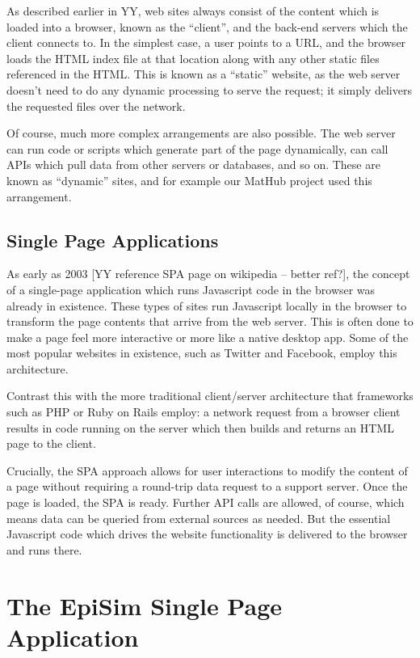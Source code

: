 As described earlier in YY, web sites always consist of the content which is loaded into a browser, known as the ``client'', and the back-end servers which the client connects to. In the simplest case, a user points to a URL, and the browser loads the HTML index file at that location along with any other static files referenced in the HTML. This is known as a ``static'' website, as the web server doesn't need to do any dynamic processing to serve the request; it simply delivers the requested files over the network.

Of course, much more complex arrangements are also possible. The web server can run code or scripts which generate part of the page dynamically, can call APIs which pull data from other servers or databases, and so on. These are known as ``dynamic'' sites, and for example our MatHub project used this arrangement.

\hypertarget{single-page-applications}{%
\subsection{Single Page Applications}\label{single-page-applications}}

As early as 2003 {[}YY reference SPA page on wikipedia -- better ref?{]}, the concept of a single-page application which runs Javascript code in the browser was already in existence. These types of sites run Javascript locally in the browser to transform the page contents that arrive from the web server. This is often done to make a page feel more interactive or more like a native desktop app. Some of the most popular websites in existence, such as Twitter and Facebook, employ this architecture.

Contrast this with the more traditional client/server architecture that frameworks such as PHP or Ruby on Rails employ: a network request from a browser client results in code running on the server which then builds and returns an HTML page to the client.

Crucially, the SPA approach allows for user interactions to modify the content of a page without requiring a round-trip data request to a support server. Once the page is loaded, the SPA is ready. Further API calls are allowed, of course, which means data can be queried from external sources as needed. But the essential Javascript code which drives the website functionality is delivered to the browser and runs there.

\hypertarget{the-episim-single-page-application}{%
\section{The EpiSim Single Page Application}\label{the-episim-single-page-application}}

